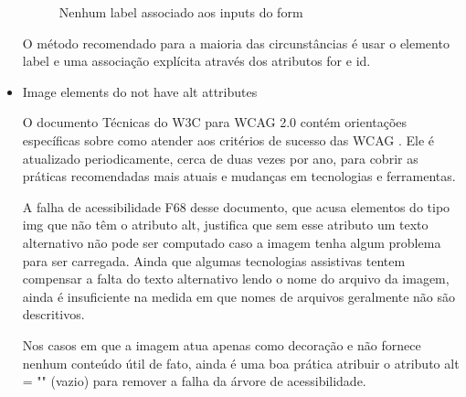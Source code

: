\documentclass[
	12pt,				%
	openright,			%
	oneside,			%
	a4paper,			%
	chapter=TITLE,		%
	section=TITLE,		%
	subsection=TITLE,	%
	subsubsection=TITLE,%
	english,			%
	brazil				%
	]{abntex2}
\theoremstyle{definition}
\begin{document}
\begin{itemize}
\begin{figure}[!h]
\centering
\caption{Nenhum label associado aos inputs do form}
\label{Nenhum label associado aos inputs do form}
\end{figure}

O método recomendado para a maioria das circunstâncias é usar o elemento label e uma associação explícita através dos atributos for e id.

 \item Image elements do not have alt attributes
   
O documento Técnicas do W3C para WCAG 2.0 contém orientações específicas sobre como atender aos critérios de sucesso das WCAG \cite{cooper2010techniques}. Ele é atualizado periodicamente, cerca de duas vezes por ano, para cobrir as práticas recomendadas mais atuais e mudanças em tecnologias e ferramentas.

A falha de acessibilidade F68 desse documento, que acusa elementos do tipo img que não têm o atributo alt, justifica que sem esse atributo um texto alternativo não pode ser computado caso a imagem tenha algum problema para ser carregada. Ainda que algumas tecnologias assistivas tentem compensar a falta do texto alternativo lendo o nome do arquivo da imagem, ainda é insuficiente na medida em que nomes de arquivos geralmente não são descritivos.

Nos casos em que a imagem atua apenas como decoração e não fornece nenhum conteúdo útil de fato, ainda é uma boa prática atribuir o atributo alt = "" (vazio) para remover a falha da árvore de acessibilidade.


\end{itemize}
\end{document}
